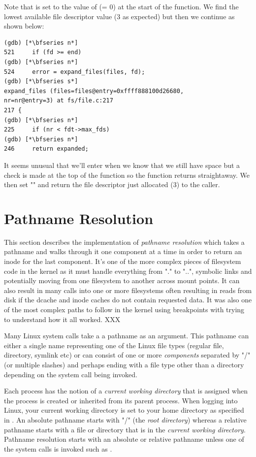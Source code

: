 \noindent
Note that  is set to the value of  (= 0) at the start of the function. We find the lowest available file descriptor value (3 as expected) but then we continue as shown below:

\begin{lstlisting}
(gdb) [*\bfseries n*]
521		if (fd >= end)
(gdb) [*\bfseries n*]
524		error = expand_files(files, fd);
(gdb) [*\bfseries s*]
expand_files (files=files@entry=0xffff888100d26680, 
nr=nr@entry=3) at fs/file.c:217
217	{
(gdb) [*\bfseries n*]
225		if (nr < fdt->max_fds)
(gdb) [*\bfseries n*]
246		return expanded;
\end{lstlisting}

\noindent
It seems unusual that we'll enter  when we know that we still have space but a check is made at the top of the function so the function returns straightaway. We then set "" and return the file descriptor just allocated (3) to the caller.


\section{Pathname Resolution}\label{pathname-resolution}

This section describes the implementation of \textit{pathname resolution} which takes a pathname and walks through it one component at a time in order to return an inode for the last component. It's one of the more complex pieces of filesystem code in the kernel as it must handle everything from "." to "..", symbolic links and potentially moving from one filesystem to another across mount points. It can also result in many calls into one or more filesystems often resulting in reads from disk if the dcache and inode caches do not contain requested data. It was also one of the most complex paths to follow in the kernel using breakpoints with  trying to understand how it all worked. XXX

Many Linux system calls take a a pathname as an argument. This pathname can either a single name representing one of the Linux file types (regular file, directory, symlink etc) or can consist of one or more \textit{components} separated by "/" (or multiple slashes) and perhaps ending with a file type other than a directory depending on the system call being invoked.

Each process has the notion of a \textit{current working directory} that is assigned when the process is created or inherited from its parent process. When logging into Linux, your current working directory is set to your home directory as specified in . An absolute pathname starts with "/" (the \textit{root directory}) whereas a relative pathname starts with a file or directory that is in the \textit{current working directory}. Pathname resolution starts with an absolute or relative pathname unless one of the  system calls is invoked such as .

